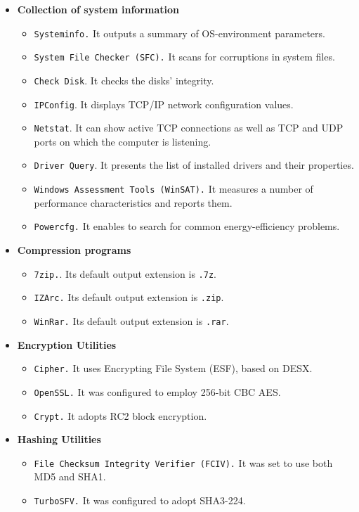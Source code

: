\begin{itemize}
\item \textbf{Collection of system information}
	   \begin{itemize}
	   \item \texttt{Systeminfo.} It outputs a summary of OS-environment parameters. 
	   \item \texttt{System File Checker (SFC).} It scans for corruptions in system files.
	   \item \texttt{Check Disk}. It checks the disks' integrity.
	   \item \texttt{IPConfig}. It displays TCP/IP network configuration values.
	   \item \texttt{Netstat}. It can show active TCP connections as well as TCP and UDP ports on which the computer is listening.
	   \item \texttt{Driver Query}. It presents the list of installed drivers and their properties.
	   \item \texttt{Windows Assessment Tools (WinSAT).} It  measures a number of performance characteristics and reports them.
	   \item \texttt{Powercfg.} It enables to search for common energy-efficiency problems. 
	   \end{itemize}
\item \textbf{Compression programs}
		\begin{itemize}
		\item \texttt{7zip.}. Its default output extension is \texttt{.7z}.
		\item \texttt{IZArc.} Its default output extension is \texttt{.zip}.
		\item \texttt{WinRar.} Its default output extension is \texttt{.rar}.
		\end{itemize}
\item \textbf{Encryption Utilities}
		\begin{itemize}
		\item \texttt{Cipher.} It uses Encrypting File System (ESF), based on DESX. 
		\item \texttt{OpenSSL.} It was configured to employ 256-bit CBC AES.
		\item \texttt{Crypt.} It adopts RC2 block encryption.
		\end{itemize}
\item \textbf{Hashing Utilities}
		\begin{itemize}
		\item \texttt{File Checksum Integrity Verifier (FCIV).} It was set to use both MD5 and SHA1.
		\item \texttt{TurboSFV.} It was configured to adopt SHA3-224. 
		\end{itemize}
\end{itemize}


